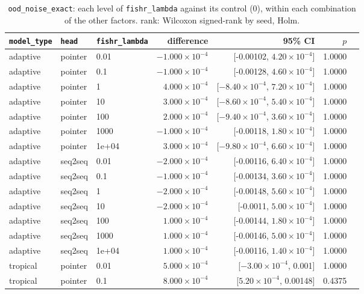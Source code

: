 \documentclass[10pt]{article}
\begin{document}
{\small
\begin{longtable}{lllrrrl}
\caption{\texttt{ood\_noise\_exact}: each level of \texttt{fishr\_lambda} against its control (0), within each combination of the other factors. rank: Wilcoxon signed-rank by seed, Holm.}\label{tab:control-ood_noise_exact}\\
\toprule
\texttt{model\_type} & \texttt{head} & \texttt{fishr\_lambda} & difference & 95\% CI & $p$ & \\
\midrule
\endhead
adaptive & pointer & 0.01 & $-1.000\times10^{-4}$ & [-0.00102, $4.20\times10^{-4}$] & 1.0000 & \\
adaptive & pointer & 0.1 & $-1.000\times10^{-4}$ & [-0.00128, $4.60\times10^{-4}$] & 1.0000 & \\
adaptive & pointer & 1 & $4.000\times10^{-4}$ & [$-8.40\times10^{-4}$, $7.20\times10^{-4}$] & 1.0000 & \\
adaptive & pointer & 10 & $3.000\times10^{-4}$ & [$-8.60\times10^{-4}$, $5.40\times10^{-4}$] & 1.0000 & \\
adaptive & pointer & 100 & $2.000\times10^{-4}$ & [$-9.40\times10^{-4}$, $3.60\times10^{-4}$] & 1.0000 & \\
adaptive & pointer & 1000 & $-1.000\times10^{-4}$ & [-0.00118, $1.80\times10^{-4}$] & 1.0000 & \\
adaptive & pointer & 1e+04 & $3.000\times10^{-4}$ & [$-9.80\times10^{-4}$, $6.60\times10^{-4}$] & 1.0000 & \\
adaptive & seq2seq & 0.01 & $-2.000\times10^{-4}$ & [-0.00116, $6.40\times10^{-4}$] & 1.0000 & \\
adaptive & seq2seq & 0.1 & $-1.000\times10^{-4}$ & [-0.00134, $3.60\times10^{-4}$] & 1.0000 & \\
adaptive & seq2seq & 1 & $-2.000\times10^{-4}$ & [-0.00148, $5.60\times10^{-4}$] & 1.0000 & \\
adaptive & seq2seq & 10 & $-2.000\times10^{-4}$ & [-0.0011, $5.00\times10^{-4}$] & 1.0000 & \\
adaptive & seq2seq & 100 & $1.000\times10^{-4}$ & [-0.00144, $1.80\times10^{-4}$] & 1.0000 & \\
adaptive & seq2seq & 1000 & $1.000\times10^{-4}$ & [-0.00146, $5.00\times10^{-4}$] & 1.0000 & \\
adaptive & seq2seq & 1e+04 & $1.000\times10^{-4}$ & [-0.00116, $1.40\times10^{-4}$] & 1.0000 & \\
tropical & pointer & 0.01 & $5.000\times10^{-4}$ & [$-3.00\times10^{-4}$, 0.001] & 1.0000 & \\
tropical & pointer & 0.1 & $8.000\times10^{-4}$ & [$5.20\times10^{-4}$, 0.00148] & 0.4375 & \\

\end{longtable}}
\end{document}
